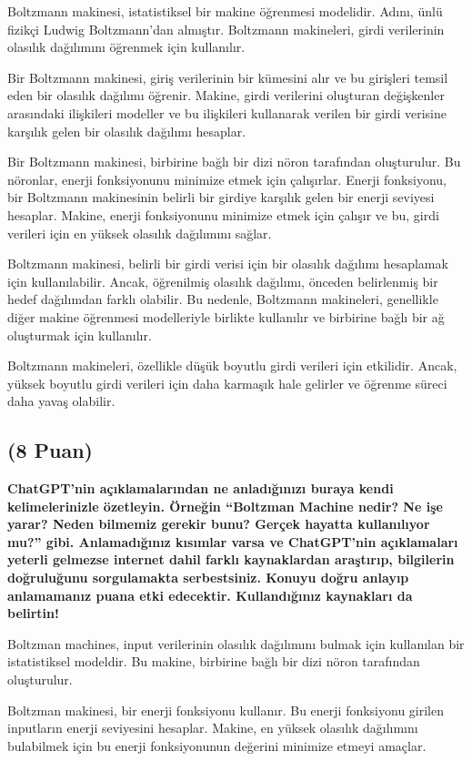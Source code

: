 \documentclass[11pt]{article}
\begin{document}
Boltzmann makinesi, istatistiksel bir makine öğrenmesi modelidir. Adını, ünlü fizikçi Ludwig Boltzmann'dan almıştır. Boltzmann makineleri, girdi verilerinin olasılık dağılımını öğrenmek için kullanılır.

Bir Boltzmann makinesi, giriş verilerinin bir kümesini alır ve bu girişleri temsil eden bir olasılık dağılımı öğrenir. Makine, girdi verilerini oluşturan değişkenler arasındaki ilişkileri modeller ve bu ilişkileri kullanarak verilen bir girdi verisine karşılık gelen bir olasılık dağılımı hesaplar.

Bir Boltzmann makinesi, birbirine bağlı bir dizi nöron tarafından oluşturulur. Bu nöronlar, enerji fonksiyonunu minimize etmek için çalışırlar. Enerji fonksiyonu, bir Boltzmann makinesinin belirli bir girdiye karşılık gelen bir enerji seviyesi hesaplar. Makine, enerji fonksiyonunu minimize etmek için çalışır ve bu, girdi verileri için en yüksek olasılık dağılımını sağlar.

Boltzmann makinesi, belirli bir girdi verisi için bir olasılık dağılımı hesaplamak için kullanılabilir. Ancak, öğrenilmiş olasılık dağılımı, önceden belirlenmiş bir hedef dağılımdan farklı olabilir. Bu nedenle, Boltzmann makineleri, genellikle diğer makine öğrenmesi modelleriyle birlikte kullanılır ve birbirine bağlı bir ağ oluşturmak için kullanılır.

Boltzmann makineleri, özellikle düşük boyutlu girdi verileri için etkilidir. Ancak, yüksek boyutlu girdi verileri için daha karmaşık hale gelirler ve öğrenme süreci daha yavaş olabilir.


\subsection{(8 Puan)} \textbf{ChatGPT’nin açıklamalarından ne anladığınızı buraya kendi kelimelerinizle özetleyin. Örneğin ``Boltzman Machine nedir? Ne işe yarar? Neden bilmemiz gerekir bunu? Gerçek hayatta kullanılıyor mu?'' gibi. Anlamadığınız kısımlar varsa ve ChatGPT’nin açıklamaları yeterli gelmezse internet dahil farklı kaynaklardan araştırıp, bilgilerin doğruluğunu sorgulamakta serbestsiniz. Konuyu doğru anlayıp anlamamanız puana etki edecektir. Kullandığınız kaynakları da belirtin!}

Boltzman machines, input verilerinin olasılık dağılımını bulmak için kullanılan bir istatistiksel modeldir. Bu makine, birbirine bağlı bir dizi nöron tarafından oluşturulur.

Boltzman makinesi, bir enerji fonksiyonu kullanır. Bu enerji fonksiyonu girilen inputların enerji seviyesini hesaplar. Makine, en yüksek olasılık dağılımını bulabilmek için bu enerji fonksiyonunun değerini minimize etmeyi amaçlar.
\end{document}
